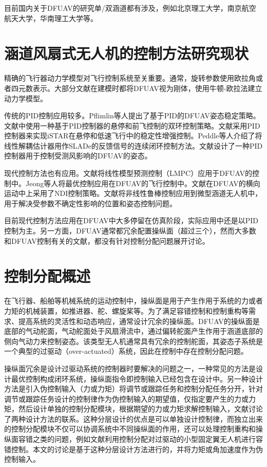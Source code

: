 目前国内关于DFUAV的研究单/双涵道都有涉及，例如北京理工大学\cite{Wang_2018,Manzoor_2020}，南京航空航天大学\cite{Zhao_2015}，华南理工大学\cite{MengChaoHeng_}等。
\section{涵道风扇式无人机的控制方法研究现状}
精确的飞行器动力学模型对飞行控制系统至关重要。通常，旋转参数使用欧拉角或者四元数表示。大部分文献在建模时都将DFUAV视为刚体，使用牛顿-欧拉法建立动力学模型\cite{Choi_2011,Fleming_2003,Fleming_2004,Graf_2008,Johnson_2005,Ko_2007,Ohanian_2012,Pflimlin_2007a,Pflimlin_2010,Tobias_2008a,Zhao_2015,Zhengjie_2013}。

传统的PID控制应用较多。Pflimlin等人提出了基于PID的DFUAV姿态稳定策略\cite{Pflimlin_2007a}。文献\parencite{Manouchehri_2011}中使用一种基于PID控制器的悬停和前飞控制的双环控制策略。文献\parencite{Lipera_2001}采用PID控制器来实现iSTAR在悬停和低速飞行中的稳定性增强控制。Peddle等人介绍了将线性解耦估计器用作SLADe的反馈信号的连续闭环控制方法\cite{Peddle_2009}。文献\parencite{Pflimlin_2010}设计了一种PID控制器用于控制受测风影响的DFUAV的姿态。

现代控制方法也有应用。文献\parencite{Banazadeh_2014}将线性模型预测控制（LMPC）应用于DFUAV的控制中。Jeong等人将最优控制应用在DFUAV的飞行控制中\cite{Jeong_2015}。文献\parencite{Sharifzadeh_2019}在DFUAV的横向运动中上采用了NDI控制策略。文献\parencite{Marconi_2006}将非线性鲁棒控制应用到微型涵道无人机中，用于解决受参数不确定性影响的位置和姿态控制问题。

目前现代控制方法应用在DFUAV中大多停留在仿真阶段，实际应用中还是以PID控制为主。另一方面，DFUAV通常都冗余配置操纵面（超过三个），然而大多数和DFUAV控制有关的文献，都没有针对控制分配问题展开讨论。
\section{控制分配概述}
在飞行器、船舶等机械系统的运动控制中，操纵面是用于产生作用于系统的力或者力矩的机械装置，如推进器、舵、螺旋桨等。为了满足容错控制和控制重构等需求、提高系统的灵活性和动态响应，通常设计冗余的操纵面\cite{Johansen_2013}。DFUAV的操纵面是底部的气动舵面，气动舵面处于风扇滑流中，通过偏转舵面产生作用于涵道底部的侧向气动力来控制姿态。该类型无人机通常具有冗余的控制舵面，其姿态子系统是一个典型的过驱动（over-actuated）系统，因此在控制中存在控制分配问题。

操纵面冗余是设计过驱动系统的控制器时要解决的问题之一，一种常见的方法是设计最优控制构成闭环系统，操纵面指令即控制输入已经包含在设计中。另一种设计方法是引入伪控制输入（力或力矩）将调节或跟踪任务和控制分配任务分开，针对调节或跟踪任务设计的控制律作为伪控制输入的期望值，仅指定要产生的力或力矩，然后设计单独的控制分配模块，根据期望的力或力矩求解控制输入，文献\parencite{Harkegard_2005}讨论了两种设计方法的联系。这种分层设计的优点是可以单独设计控制律，而独立出来的控制分配模块不仅可以协调系统中不同操纵面的作用，还可以处理控制重构和操纵面容错之类的问题，例如文献\cite{Baggi_2020}利用控制分配对过驱动的小型固定翼无人机进行容错控制。本文的讨论是基于这种分层设计方法进行的，并将力矩或角加速度作为伪控制输入。

